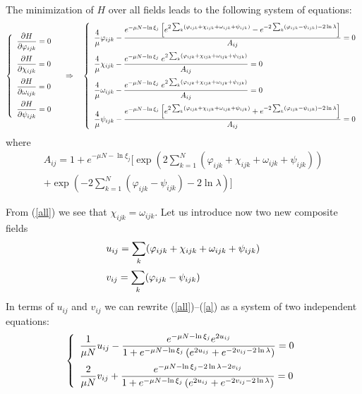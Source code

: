 \documentclass[aps,12pt]{revtex4}
\newcommand{\eq}[1]{(\ref{#1})}
\newcommand{\be}{\begin{equation}}
\newcommand{\ee}{\end{equation}}
\newcommand\disp{\displaystyle}
\begin{document}
\begin{appendix}
The minimization of $H$ over all fields leads to the following system of equations:
\be
\left\{\begin{array}{l}
\disp \frac{\partial H}{\partial \varphi_{ijk}} = 0 \medskip \\
\disp \frac{\partial H}{\partial \chi_{ijk}} = 0 \medskip \\
\disp \frac{\partial H}{\partial \omega_{ijk}} = 0 \medskip \\
\disp \frac{\partial H}{\partial \psi_{ijk}} = 0
\end{array} \right.
\quad \Rightarrow \quad \left\{\begin{array}{l} \disp \frac{4}{\mu} \varphi_{ijk} - \frac{e^{-\mu N-\ln\xi_j}\left[e^{2\sum_k(\varphi_{ijk}+\chi_{ijk}+\omega_{ijk}+ \psi_{ijk})}- e^{-2\sum_k(\varphi_{ijk}-\psi_{ijk})-2\ln \lambda}\right]}{A_{ij}} = 0 \medskip \\
\disp \frac{4}{\mu} \chi_{ijk} - \frac{e^{-\mu N-\ln\xi_j}\; e^{2\sum_k(\varphi_{ijk}+\chi_{ijk}+\omega_{ijk}+\psi_{ijk})}}{A_{ij}} = 0 \medskip \\
\disp \frac{4}{\mu} \omega_{ijk} -  \frac{e^{-\mu N-\ln\xi_j}\; e^{2\sum_k(\varphi_{ijk}+\chi_{ijk}+ \omega_{ijk}+\psi_{ijk})}}{A_{ij}} = 0 \medskip \\
\disp \frac{4}{\mu} \psi_{ijk} - \frac{e^{-\mu N-\ln\xi_j}\left[e^{2\sum_k(\varphi_{ijk}+\chi_{ijk}+\omega_{ijk}+\psi_{ijk})}+ e^{-2\sum_k(\varphi_{ijk}-\psi_{ijk})-2\ln \lambda}\right]}{A_{ij}} = 0
\end{array} \right.
\label{all}
\ee
where
\begin{multline}
A_{ij}=1+e^{-\mu N-\ln\xi_j}\Bigg[\exp\left(2\sum_{k=1}^N\left(\varphi_{ijk}+\chi_{ijk}+\omega_{ijk}+ \psi_{ijk}\right)\right) \\ + \exp\left(-2\sum_{k=1}^N\left(\varphi_{ijk}-\psi_{ijk}\right)-2\ln \lambda\right) \Bigg]
\label{a}
\end{multline}

From \eq{all} we see that $\chi_{ijk} = \omega_{ijk}$. Let us introduce now two new composite fields
\be
\begin{array}{l}
\disp u_{ij} = \sum_k(\varphi_{ijk}+\chi_{ijk}+\omega_{ijk}+\psi_{ijk}) \medskip \\
\disp v_{ij} = \sum_k(\varphi_{ijk}-\psi_{ijk})
\end{array}
\ee
In terms of $u_{ij}$ and $v_{ij}$ we can rewrite \eq{all}--\eq{a} as a system of two independent
equations:
\be
\left\{\begin{array}{l} \disp \frac{1}{\mu N} u_{ij} - \frac{e^{-\mu N-\ln\xi_j} e^{2u_{ij}}}{1+e^{-\mu N-\ln\xi_j}\left(e^{2u_{ij}}+e^{-2v_{ij}-2\ln \lambda}\right)} = 0 \medskip \\
\disp \frac{2}{\mu N} v_{ij} + \frac{e^{-\mu N-\ln\xi_j-2\ln \lambda-2v_{ij}}} {1+e^{-\mu N-\ln\xi_j}\left(e^{2u_{ij}}+e^{-2v_{ij}-2\ln \lambda}\right)}=0
\end{array} \right.
\ee


\end{appendix}
\end{document}
